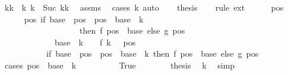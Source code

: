 \begin{isabellebody}
\ kk\ \ k{\isacharcolon}{\kern0pt}\ {\isachardoublequoteopen}k\ {\isacharequal}{\kern0pt}\ Suc\ kk{\isachardoublequoteclose}\ \isamarkupfalse%
\ assms\ \isamarkupfalse%
\ {\isacharparenleft}{\kern0pt}cases\ k{\isacharparenright}{\kern0pt}\ auto\isanewline
\ \ \isamarkupfalse%
\ {\isacharquery}{\kern0pt}thesis\isanewline
\ \ \isamarkupfalse%
\ {\isacharparenleft}{\kern0pt}rule\ ext{\isacharparenright}{\kern0pt}\isanewline
\ \ \ \ \isamarkupfalse%
\ pos\isanewline
\ \ \ \ \isamarkupfalse%
\ {\isachardoublequoteopen}{\isacharparenleft}{\kern0pt}{\isacharparenleft}{\kern0pt}{\isasymlambda}pos{\isachardot}{\kern0pt}\ if\ base\ {\isasymle}\ pos\ {\isasymand}\ pos\ {\isacharless}{\kern0pt}\ base\ {\isacharplus}{\kern0pt}\ {\isacharparenleft}{\kern0pt}k\ {\isacharminus}{\kern0pt}\ {}{\isacharparenright}{\kern0pt}\isanewline
\ \ \ \ \ \ \ \ \ \ \ \ \ \ \ \ \ \ \ then\ f\ {\isacharparenleft}{\kern0pt}pos\ {\isacharminus}{\kern0pt}\ base{\isacharparenright}{\kern0pt}\ else\ g\ pos{\isacharparenright}{\kern0pt}\isanewline
\ \ \ \ \ \ \ \ \ \ \ \ \ {\isacharparenleft}{\kern0pt}base\ {\isacharplus}{\kern0pt}\ {\isacharparenleft}{\kern0pt}k\ {\isacharminus}{\kern0pt}\ {}{\isacharparenright}{\kern0pt}\ {\isacharcolon}{\kern0pt}{\isacharequal}{\kern0pt}\ f\ {\isacharparenleft}{\kern0pt}k\ {\isacharminus}{\kern0pt}\ {}{\isacharparenright}{\kern0pt}{\isacharparenright}{\kern0pt}{\isacharparenright}{\kern0pt}\ pos\isanewline
\ \ \ \ \ \ \ \ \ \ {\isacharequal}{\kern0pt}\ {\isacharparenleft}{\kern0pt}if\ base\ {\isasymle}\ pos\ {\isasymand}\ pos\ {\isacharless}{\kern0pt}\ base\ {\isacharplus}{\kern0pt}\ k\ then\ f\ {\isacharparenleft}{\kern0pt}pos\ {\isacharminus}{\kern0pt}\ base{\isacharparenright}{\kern0pt}\ else\ g\ pos{\isacharparenright}{\kern0pt}{\isachardoublequoteclose}\isanewline
\ \ \ \ \isamarkupfalse%
\ {\isacharparenleft}{\kern0pt}cases\ {\isachardoublequoteopen}pos\ {\isacharequal}{\kern0pt}\ base\ {\isacharplus}{\kern0pt}\ {\isacharparenleft}{\kern0pt}k\ {\isacharminus}{\kern0pt}\ {}{\isacharparenright}{\kern0pt}{\isachardoublequoteclose}{\isacharparenright}{\kern0pt}\isanewline
\ \ \ \ \ \ \isamarkupfalse%
\ True\isanewline
\ \ \ \ \ \ \isamarkupfalse%
\ {\isacharquery}{\kern0pt}thesis\ \isamarkupfalse%
\ k\ \isamarkupfalse%
\ simp\isanewline
\ \ \ \ \isamarkupfalse%

\end{isabellebody}
